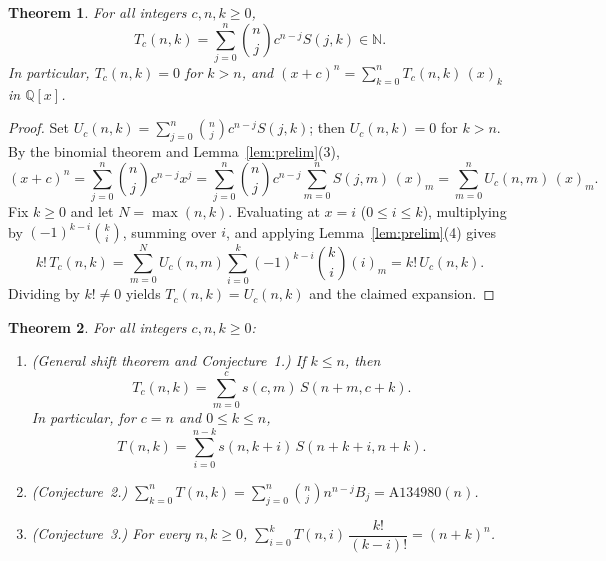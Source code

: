 \documentclass[11pt]{article}
\newtheorem{theorem}{Theorem}
\begin{document}
\begin{theorem}\label{thm:exp}
For all integers $c, n, k \ge 0$,
\[
  T_c(n, k) = \sum_{j=0}^{n} \binom{n}{j} c^{n - j} S(j, k) \in \mathbb{N}.
\]
In particular, $T_c(n, k) = 0$ for $k > n$, and $(x + c)^n = \sum_{k=0}^{n} T_c(n, k)\, (x)_k$ in $\mathbb{Q}[x]$.
\end{theorem}

\begin{proof}
Set $U_c(n, k) = \sum_{j=0}^{n} \binom{n}{j} c^{n - j} S(j, k)$; then $U_c(n, k) = 0$ for $k > n$. By the binomial theorem and Lemma~\ref{lem:prelim}(3),
\[
  (x + c)^n = \sum_{j=0}^{n} \binom{n}{j} c^{n - j} x^j = \sum_{j=0}^{n} \binom{n}{j} c^{n - j} \sum_{m=0}^{n} S(j, m)\, (x)_m = \sum_{m=0}^{n} U_c(n, m)\, (x)_m.
\]
Fix $k \ge 0$ and let $N = \max(n, k)$. Evaluating at $x = i$ ($0 \le i \le k$), multiplying by $(-1)^{k - i} \binom{k}{i}$, summing over $i$, and applying Lemma~\ref{lem:prelim}(4) gives
\[
  k!\, T_c(n, k) = \sum_{m=0}^{N} U_c(n, m) \sum_{i=0}^{k} (-1)^{k - i} \binom{k}{i} (i)_m = k!\, U_c(n, k).
\]
Dividing by $k! \ne 0$ yields $T_c(n, k) = U_c(n, k)$ and the claimed expansion.
\end{proof}

\begin{theorem}\label{thm:conjs}
For all integers $c, n, k \ge 0$:
\begin{enumerate}
  \item \emph{(General shift theorem and Conjecture~1.)} If $k \le n$, then
  \[
    T_c(n, k) = \sum_{m=0}^{c} s(c, m)\, S(n + m, c + k).
  \]
  In particular, for $c = n$ and $0 \le k \le n$,
  \[
    T(n, k) = \sum_{i=0}^{n - k} s(n, k + i)\, S(n + k + i, n + k).
  \]
  \item \emph{(Conjecture~2.)} $\sum_{k=0}^{n} T(n, k) = \sum_{j=0}^{n} \binom{n}{j} n^{n - j} B_j = \mathrm{A134980}(n)$.
  \item \emph{(Conjecture~3.)} For every $n, k \ge 0$, $\sum_{i=0}^{k} T(n, i)\, \dfrac{k!}{(k - i)!} = (n + k)^n$.
\end{enumerate}
\end{theorem}
\end{document}
